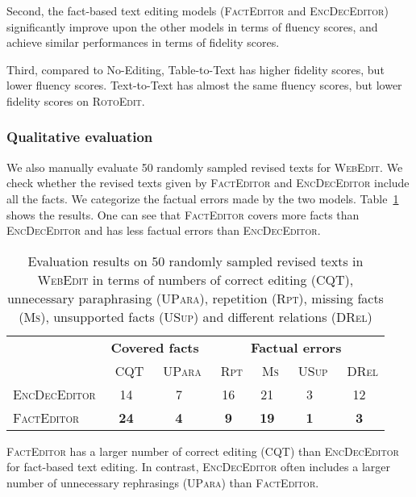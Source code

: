 \documentclass[11pt,a4paper]{article}
\begin{document}
Second, the fact-based text editing models (\textsc{FactEditor} and \textsc{EncDecEditor}) significantly improve upon the other models in terms of fluency scores, and achieve similar performances in terms of fidelity scores.

Third, compared to No-Editing, Table-to-Text has higher fidelity scores, but lower fluency scores. Text-to-Text has almost the same fluency scores, but lower fidelity scores on \textsc{RotoEdit}.


\subsubsection*{Qualitative evaluation}
We also manually evaluate 50 randomly sampled revised texts for \textsc{WebEdit}. We check whether the revised texts given by \textsc{FactEditor} and \textsc{EncDecEditor} include all the facts. We categorize the factual errors made by the two models. Table~\ref{tab:error} shows the results. One can see that \textsc{FactEditor} covers more facts than \textsc{EncDecEditor} and has less factual errors than \textsc{EncDecEditor}. 

\begin{table}[t]
    \centering
    \scriptsize
    \setlength\tabcolsep{2.5pt}
    \begin{tabular}{l|cc|cccc}
        \toprule
        & \multicolumn{2}{c|}{\textbf{Covered facts}} & \multicolumn{4}{c}{\textbf{Factual errors}}\\
        & ~\textsc{CQT}  & ~\textsc{UPara} & ~\textsc{Rpt} & ~\textsc{Ms} & ~\textsc{USup} & ~\textsc{DRel} \\\midrule
        \textsc{EncDecEditor}& 14 & 7 & 16 & 21 & 3 & 12\\
        \textsc{FactEditor} & \textbf{24} & \textbf{4} & \textbf{9} &\textbf{19} &\textbf{1} &\textbf{3}\\
        \bottomrule
    \end{tabular}
    \caption{Evaluation results on 50 randomly sampled revised texts in \textsc{WebEdit} in terms of numbers of correct editing (\textsc{CQT}), unnecessary paraphrasing (\textsc{UPara}),  repetition (\textsc{Rpt}), missing facts (\textsc{Ms}), unsupported facts (\textsc{USup}) and different relations (\textsc{DRel})}
    \label{tab:error}
\end{table}

\textsc{FactEditor} has a larger number of correct editing (\textsc{CQT}) than \textsc{EncDecEditor} for fact-based text editing. In contrast, \textsc{EncDecEditor} often includes a larger number of unnecessary rephrasings (\textsc{UPara}) than \textsc{FactEditor}.
\end{document}
